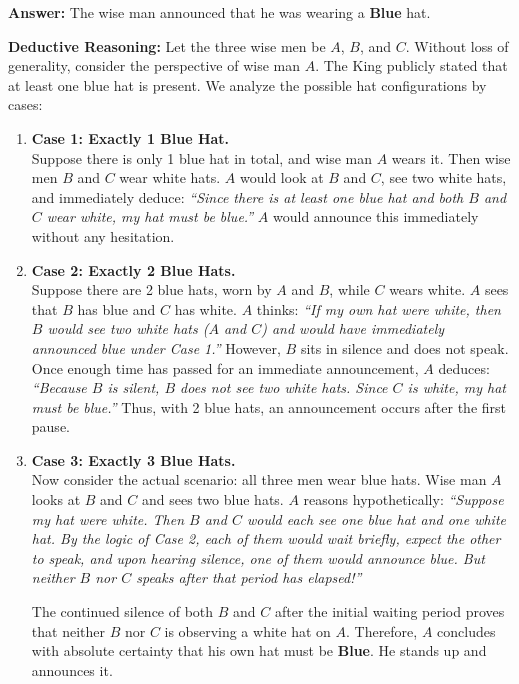\documentclass[12pt]{article}
\begin{document}
\textbf{Answer:} The wise man announced that he was wearing a \textbf{Blue} hat.

\textbf{Deductive Reasoning:}
Let the three wise men be $A$, $B$, and $C$. Without loss of generality, consider the perspective of wise man $A$.
The King publicly stated that at least one blue hat is present. We analyze the possible hat configurations by cases:

\begin{enumerate}
    \item \textbf{Case 1: Exactly 1 Blue Hat.} \\
    Suppose there is only 1 blue hat in total, and wise man $A$ wears it. Then wise men $B$ and $C$ wear white hats. $A$ would look at $B$ and $C$, see two white hats, and immediately deduce: \textit{``Since there is at least one blue hat and both $B$ and $C$ wear white, my hat must be blue.''} $A$ would announce this immediately without any hesitation.

    \item \textbf{Case 2: Exactly 2 Blue Hats.} \\
    Suppose there are 2 blue hats, worn by $A$ and $B$, while $C$ wears white.
    $A$ sees that $B$ has blue and $C$ has white. $A$ thinks: \textit{``If my own hat were white, then $B$ would see two white hats ($A$ and $C$) and would have immediately announced blue under Case 1.''}
    However, $B$ sits in silence and does not speak. Once enough time has passed for an immediate announcement, $A$ deduces: \textit{``Because $B$ is silent, $B$ does not see two white hats. Since $C$ is white, my hat must be blue.''} Thus, with 2 blue hats, an announcement occurs after the first pause.

    \item \textbf{Case 3: Exactly 3 Blue Hats.} \\
    Now consider the actual scenario: all three men wear blue hats.
    Wise man $A$ looks at $B$ and $C$ and sees two blue hats. $A$ reasons hypothetically:
    \textit{``Suppose my hat were white. Then $B$ and $C$ would each see one blue hat and one white hat. By the logic of Case 2, each of them would wait briefly, expect the other to speak, and upon hearing silence, one of them would announce blue. But neither $B$ nor $C$ speaks after that period has elapsed!''}

    The continued silence of both $B$ and $C$ after the initial waiting period proves that neither $B$ nor $C$ is observing a white hat on $A$.
    Therefore, $A$ concludes with absolute certainty that his own hat must be \textbf{Blue}. He stands up and announces it.
\end{enumerate}
\end{document}
